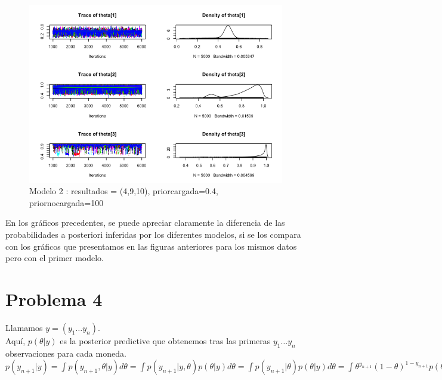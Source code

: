 \documentclass[a4paper]{article}
\begin{document}
\begin{figure}[h!]
\centering
\includegraphics[scale=0.5] {img6.png}
\caption{ Modelo 2 : resultados = (4,9,10), priorcargada=0.4, priornocargada=100 }
\end{figure}

En los gráficos precedentes, se puede apreciar claramente la diferencia de las probabilidades
a posteriori inferidas por los diferentes modelos, si se los compara con los 
gráficos que presentamos en las figuras anteriores para los mismos datos pero con el 
primer modelo.

\newpage
\section {Problema 4}
Llamamos $ y = ( y_1 \dots y_n ) $. \\

Aquí, $ p(\theta | y) $ es la posterior predictive que obtenemos tras las primeras
$ y_1 \dots y_n $ observaciones para cada moneda. \\

$ 
p(y_{n+1} | y) =  \int p(y_{n+1}, \theta | y) d\theta 
			   =  \int p(y_{n+1} | y, \theta) p(\theta | y) d \theta
			   =  \int p(y_{n+1} | \theta) p(\theta | y) d \theta
			   =  \int \theta^{y_{n+1}} (1 - \theta)^{1 - y_{n+1}} p(\theta | y) d \theta
$

%
%
% 
%
\end{document}

